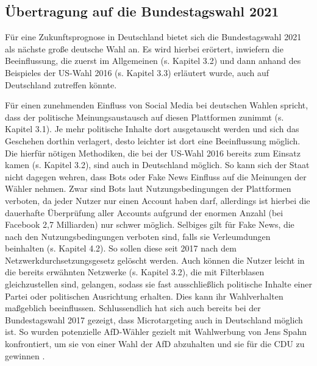 \subsection{Übertragung auf die Bundestagswahl 2021}
Für eine Zukunftsprognose in Deutschland bietet sich die Bundestagswahl 2021 als nächste große deutsche Wahl an. Es wird hierbei erörtert, inwiefern die Beeinflussung, die zuerst im Allgemeinen (s. Kapitel 3.2) und dann anhand des Beispieles der US-Wahl 2016 (s. Kapitel 3.3) erläutert wurde, auch auf Deutschland zutreffen könnte.

Für einen zunehmenden Einfluss von Social Media bei deutschen Wahlen spricht, dass der politische Meinungsaustausch auf diesen Plattformen zunimmt (s. Kapitel 3.1). Je mehr politische Inhalte dort ausgetauscht werden und sich das Geschehen dorthin verlagert, desto leichter ist dort eine Beeinflussung möglich. 
Die hierfür nötigen Methodiken, die bei der US-Wahl 2016 bereits zum Einsatz kamen (s. Kapitel 3.2), sind auch in Deutschland möglich. So kann sich der Staat nicht dagegen wehren, dass Bots oder Fake News Einfluss auf die Meinungen der Wähler nehmen. Zwar sind Bots laut Nutzungsbedingungen der Plattformen \autocite[vgl.][]{TwitterRules}\autocite[vgl.][]{NutzungsbFacebook}\autocite[vgl.][]{NutzungsbYouTube} verboten, da jeder Nutzer nur einen Account haben darf, allerdings ist hierbei die dauerhafte Überprüfung aller Accounts aufgrund der enormen Anzahl (bei Facebook 2,7 Milliarden) \autocite[vgl.][]{SMNutzer} nur schwer möglich. Selbiges gilt für Fake News, die nach den Nutzungsbedingungen verboten sind, falls sie Verleumdungen beinhalten (s. Kapitel 4.2). So sollen diese seit 2017 nach dem Netzwerkdurchsetzungsgesetz gelöscht werden.
Auch können die Nutzer leicht in die bereits erwähnten Netzwerke (s. Kapitel 3.2), die mit Filterblasen gleichzustellen sind, gelangen, sodass sie fast ausschließlich politische Inhalte einer Partei oder politischen Ausrichtung erhalten. Dies kann ihr Wahlverhalten maßgeblich beeinflussen.
Schlussendlich hat sich auch bereits bei der Bundestagswahl 2017 gezeigt, dass Microtargeting auch in Deutschland möglich ist. So wurden potenzielle AfD-Wähler gezielt mit Wahlwerbung von Jens Spahn konfrontiert, um sie von einer Wahl der AfD abzuhalten und sie für die CDU zu gewinnen \autocite[vgl.][5]{microtargeting}.

